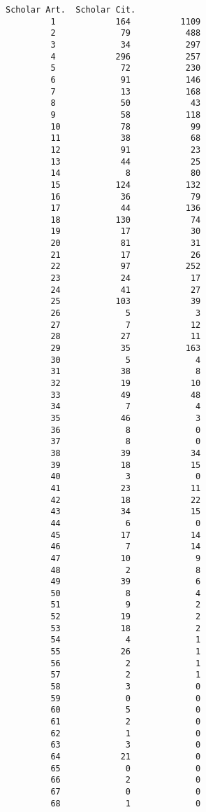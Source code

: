 \documentclass[11pt]{article}
\begin{document}
\begin{Verbatim}[commandchars=\\\{\}]
             Scholar Art.  Scholar Cit.  
         1            164          1109  
         2             79           488  
         3             34           297  
         4            296           257  
         5             72           230  
         6             91           146  
         7             13           168  
         8             50            43  
         9             58           118  
         10            78            99  
         11            38            68  
         12            91            23  
         13            44            25  
         14             8            80  
         15           124           132  
         16            36            79  
         17            44           136  
         18           130            74  
         19            17            30  
         20            81            31  
         21            17            26  
         22            97           252  
         23            24            17  
         24            41            27  
         25           103            39  
         26             5             3  
         27             7            12  
         28            27            11  
         29            35           163  
         30             5             4  
         31            38             8  
         32            19            10  
         33            49            48  
         34             7             4  
         35            46             3  
         36             8             0  
         37             8             0  
         38            39            34  
         39            18            15  
         40             3             0  
         41            23            11  
         42            18            22  
         43            34            15  
         44             6             0  
         45            17            14  
         46             7            14  
         47            10             9  
         48             2             8  
         49            39             6  
         50             8             4  
         51             9             2  
         52            19             2  
         53            18             2  
         54             4             1  
         55            26             1  
         56             2             1  
         57             2             1  
         58             3             0  
         59             0             0  
         60             5             0  
         61             2             0  
         62             1             0  
         63             3             0  
         64            21             0  
         65             0             0  
         66             2             0  
         67             0             0  
         68             1             0  
\end{Verbatim}
        
\end{document}
